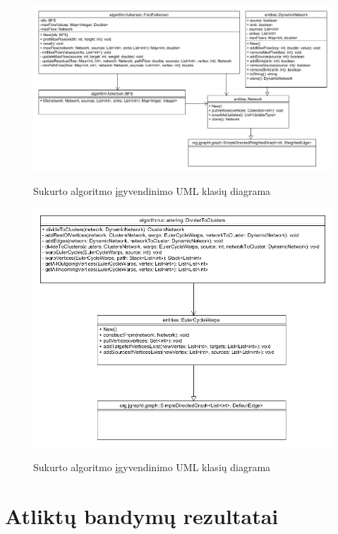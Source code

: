 \documentclass{VUMIFInfBakalaurinis}
\begin{document}
\begin{figure}[h]
	\caption{Sukurto algoritmo įgyvendinimo UML klasių diagrama}
	\centering
	\includegraphics[width=1.5\textwidth, height=0.6\textheight, angle=90]{img/architecture1.png}
	\label{fig:architecture1}
\end{figure}

\begin{figure}[h]
	\caption{Sukurto algoritmo įgyvendinimo UML klasių diagrama}
	\centering
	\includegraphics[width=\textwidth, height=0.6\textheight]{img/architecture2.png}
	\label{fig:architecture2}
\end{figure}

\section{Atliktų bandymų rezultatai}

\end{document}
